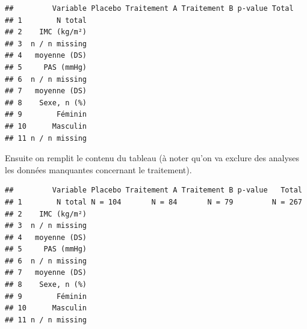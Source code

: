 \documentclass[
]{book}
\newenvironment{Shaded}{\begin{snugshade}}{\end{snugshade}}
\newcommand{\AttributeTok}[1]{\textcolor[rgb]{0.13,0.29,0.53}{#1}}
\newcommand{\DecValTok}[1]{\textcolor[rgb]{0.00,0.00,0.81}{#1}}
\newcommand{\DocumentationTok}[1]{\textcolor[rgb]{0.56,0.35,0.01}{\textbf{\textit{#1}}}}
\newcommand{\FunctionTok}[1]{\textcolor[rgb]{0.13,0.29,0.53}{\textbf{#1}}}
\newcommand{\NormalTok}[1]{#1}
\newcommand{\OtherTok}[1]{\textcolor[rgb]{0.56,0.35,0.01}{#1}}
\newcommand{\SpecialCharTok}[1]{\textcolor[rgb]{0.81,0.36,0.00}{\textbf{#1}}}
\newcommand{\StringTok}[1]{\textcolor[rgb]{0.31,0.60,0.02}{#1}}
\begin{document}
\begin{verbatim}
##         Variable Placebo Traitement A Traitement B p-value Total
## 1        N total                                                
## 2    IMC (kg/m²)                                                
## 3  n / n missing                                                
## 4   moyenne (DS)                                                
## 5     PAS (mmHg)                                                
## 6  n / n missing                                                
## 7   moyenne (DS)                                                
## 8    Sexe, n (%)                                                
## 9        Féminin                                                
## 10      Masculin                                                
## 11 n / n missing
\end{verbatim}

Ensuite on remplit le contenu du tableau (à noter qu'on va exclure des analyses les données manquantes concernant le traitement).

\begin{Shaded}
\end{Shaded}

\begin{verbatim}
##         Variable Placebo Traitement A Traitement B p-value   Total
## 1        N total N = 104       N = 84       N = 79         N = 267
## 2    IMC (kg/m²)                                                  
## 3  n / n missing                                                  
## 4   moyenne (DS)                                                  
## 5     PAS (mmHg)                                                  
## 6  n / n missing                                                  
## 7   moyenne (DS)                                                  
## 8    Sexe, n (%)                                                  
## 9        Féminin                                                  
## 10      Masculin                                                  
## 11 n / n missing
\end{verbatim}
\end{document}
